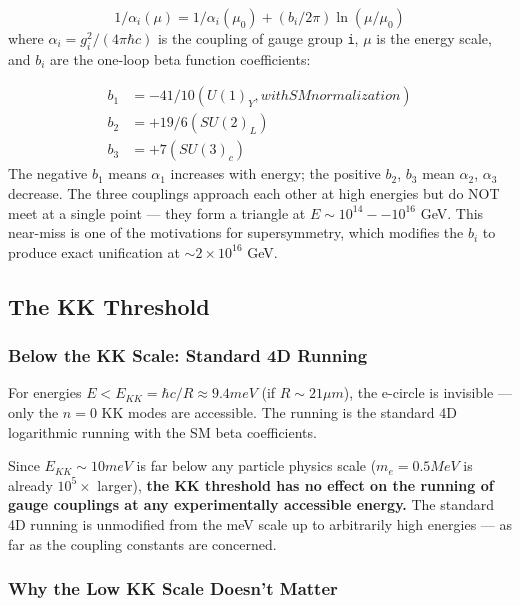\documentclass[aps,prd,preprint,superscriptaddress,longbibliography,floatfix]{revtex4-2}
\theoremstyle{remark}
\begin{document}
\begin{equation}
    1/\alpha_{i}(\mu) = 1/\alpha_{i}(\mu_{0}) + (b_{i}/2\pi) \ln(\mu/\mu_{0})
\end{equation}
where $\alpha_{i} = g_{i}^{2}/(4\pi\hbar c)$ is the coupling of gauge group \texttt{i}, $\mu$ is the energy scale, and $b_{i}$ are the one-loop beta function coefficients:


\begin{align}
    b_{1} &= -41/10     (U(1)_Y, with SM normalization) \\
    b_{2} &= +19/6      (SU(2)_L) \\
    b_{3} &= +7          (SU(3)_c)
\end{align}
The negative $b_{1}$ means $\alpha_{1}$ increases with energy; the positive $b_{2}$, $b_{3}$ mean $\alpha_{2}$, $\alpha_{3}$ decrease. The three couplings approach each other at high energies but do NOT meet at a single point --- they form a triangle at $E \sim  10^{14}--10^{16}$ GeV. This near-miss is one of the motivations for supersymmetry, which modifies the $b_{i}$ to produce exact unification at $\sim 2 \times 10^{16}$ GeV.



\subsection{The KK Threshold}


\subsubsection{Below the KK Scale: Standard 4D Running}

For energies $E < E_{KK} = \hbar c/R \approx 9.4 meV$ (if $R \sim  21 \mu m$), the e-circle is invisible --- only the $n = 0$ KK modes are accessible. The running is the standard 4D logarithmic running with the SM beta coefficients.

Since $E_{KK} \sim  10 meV$ is far below any particle physics scale ($m_e = 0.5 MeV$ is already $10^{5} \times$ larger), \textbf{the KK threshold has no effect on the running of gauge couplings at any experimentally accessible energy.} The standard 4D running is unmodified from the meV scale up to arbitrarily high energies --- as far as the coupling constants are concerned.


\subsubsection{Why the Low KK Scale Doesn't Matter}
\end{document}
